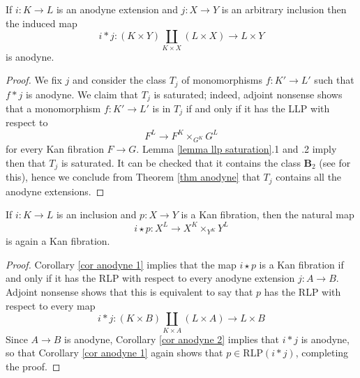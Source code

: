\begin{refsection}
\begin{cor} \label{cor anodyne 2}
If $i \colon K \to L$ is an anodyne extension and $j \colon X \to Y$ is an arbitrary inclusion then the induced map
\[
i * j \colon (K \times Y) \coprod_{K \times X} (L \times X) \to L \times Y
\]
is anodyne.
\end{cor}

\begin{proof}
We fix $j$ and consider the class $T_j$ of monomorphisms $f \colon K' \to L'$ such that $f * j$ is anodyne. We claim that $T_j$ is saturated; indeed, adjoint nonsense shows that a monomorphism $f \colon K' \to L'$ is in $T_j$ if and only if it has the LLP with respect to
\[
F^L \to F^K \times_{G^K} G^L
\]
for every Kan fibration $F \to G$. Lemma \ref{lemma llp saturation}.1 and .2 imply then that $T_j$ is saturated. It can be checked that it contains the class $\mathbf B_2$ (see \cite[Corollary I.4.6]{gj} for this), hence we conclude from Theorem \ref{thm anodyne} that $T_j$ contains all the anodyne extensions.
\end{proof}

\begin{cor} \label{cor anodyne 3}
If $i \colon K \to L$ is an inclusion and $p \colon X \to Y$ is a Kan fibration, then the natural map
\[
i \star p \colon X^L \to X^K \times_{Y^K} Y^L
\]
is again a Kan fibration.
\end{cor}

\begin{proof}
Corollary \ref{cor anodyne 1} implies that the map $i \star p$ is a Kan fibration if and only if it has the RLP with respect to every anodyne extension $j \colon A \to B$. Adjoint nonsense shows that this is equivalent to say that $p$ has the RLP with respect to every map
\[
i * j \colon (K \times B) \coprod_{K \times A} (L \times A) \to L \times B
\]
Since $A \to B$ is anodyne, Corollary \ref{cor anodyne 2} implies that $i * j$ is anodyne, so that Corollary \ref{cor anodyne 1} again shows that $p \in \mathrm{RLP}(i * j)$, completing the proof.
\end{proof}

\printbibliography[heading = local]

\end{refsection}
